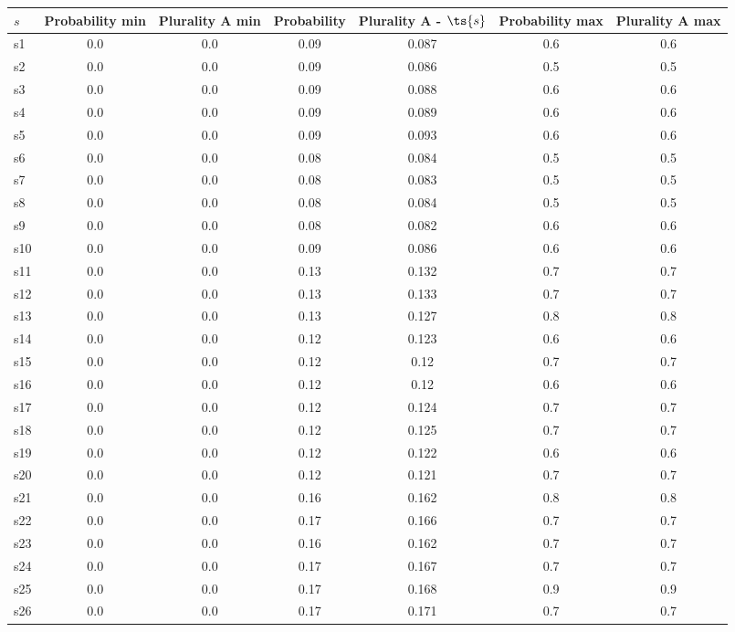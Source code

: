 \documentclass{article}
\begin{document}
\noindent\begin{tabular}{|l|c|c|c|c|c|c|}
\hline
$s$& Probability min & Plurality A min & Probability & Plurality A - $\ts{s}$ & Probability max & Plurality A max\\
\hline
s1 &0.0 & 0.0 & 0.09 & 0.087 & 0.6 & 0.6\\
\hline
s2 &0.0 & 0.0 & 0.09 & 0.086 & 0.5 & 0.5\\
\hline
s3 &0.0 & 0.0 & 0.09 & 0.088 & 0.6 & 0.6\\
\hline
s4 &0.0 & 0.0 & 0.09 & 0.089 & 0.6 & 0.6\\
\hline
s5 &0.0 & 0.0 & 0.09 & 0.093 & 0.6 & 0.6\\
\hline
s6 &0.0 & 0.0 & 0.08 & 0.084 & 0.5 & 0.5\\
\hline
s7 &0.0 & 0.0 & 0.08 & 0.083 & 0.5 & 0.5\\
\hline
s8 &0.0 & 0.0 & 0.08 & 0.084 & 0.5 & 0.5\\
\hline
s9 &0.0 & 0.0 & 0.08 & 0.082 & 0.6 & 0.6\\
\hline
s10 &0.0 & 0.0 & 0.09 & 0.086 & 0.6 & 0.6\\
\hline
s11 &0.0 & 0.0 & 0.13 & 0.132 & 0.7 & 0.7\\
\hline
s12 &0.0 & 0.0 & 0.13 & 0.133 & 0.7 & 0.7\\
\hline
s13 &0.0 & 0.0 & 0.13 & 0.127 & 0.8 & 0.8\\
\hline
s14 &0.0 & 0.0 & 0.12 & 0.123 & 0.6 & 0.6\\
\hline
s15 &0.0 & 0.0 & 0.12 & 0.12 & 0.7 & 0.7\\
\hline
s16 &0.0 & 0.0 & 0.12 & 0.12 & 0.6 & 0.6\\
\hline
s17 &0.0 & 0.0 & 0.12 & 0.124 & 0.7 & 0.7\\
\hline
s18 &0.0 & 0.0 & 0.12 & 0.125 & 0.7 & 0.7\\
\hline
s19 &0.0 & 0.0 & 0.12 & 0.122 & 0.6 & 0.6\\
\hline
s20 &0.0 & 0.0 & 0.12 & 0.121 & 0.7 & 0.7\\
\hline
s21 &0.0 & 0.0 & 0.16 & 0.162 & 0.8 & 0.8\\
\hline
s22 &0.0 & 0.0 & 0.17 & 0.166 & 0.7 & 0.7\\
\hline
s23 &0.0 & 0.0 & 0.16 & 0.162 & 0.7 & 0.7\\
\hline
s24 &0.0 & 0.0 & 0.17 & 0.167 & 0.7 & 0.7\\
\hline
s25 &0.0 & 0.0 & 0.17 & 0.168 & 0.9 & 0.9\\
\hline
s26 &0.0 & 0.0 & 0.17 & 0.171 & 0.7 & 0.7\\

\end{tabular}
\end{document}
